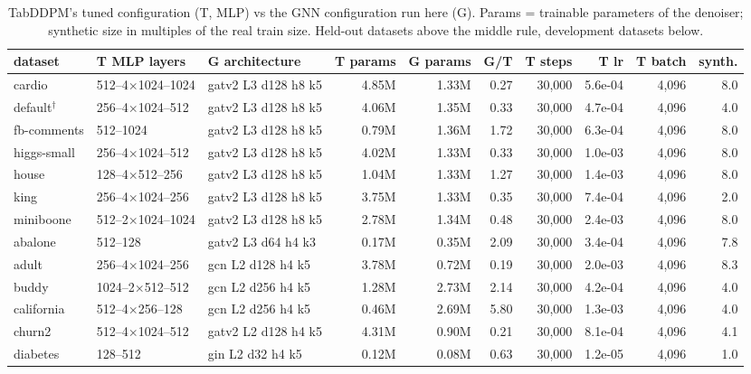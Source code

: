 \begin{table}[t]
\centering\footnotesize
\setlength{\tabcolsep}{3pt}
\caption{TabDDPM's tuned configuration (T, MLP) vs the GNN configuration run here (G). Params = trainable parameters of the denoiser; synthetic size in multiples of the real train size. Held-out datasets above the middle rule, development datasets below.}
\label{tab:config-comparison}
\begin{tabular}{lllrrrrrrr}
\toprule
dataset & T MLP layers & G architecture & T params & G params & G/T & T steps & T lr & T batch & synth. \\
\midrule
cardio & 512--4$\times$1024--1024 & gatv2 L3 d128 h8 k5 & 4.85M & 1.33M & 0.27 & 30{,}000 & 5.6e-04 & 4{,}096 & 8.0 \\
default$^\dagger$ & 256--4$\times$1024--512 & gatv2 L3 d128 h8 k5 & 4.06M & 1.35M & 0.33 & 30{,}000 & 4.7e-04 & 4{,}096 & 4.0 \\
fb-comments & 512--1024 & gatv2 L3 d128 h8 k5 & 0.79M & 1.36M & 1.72 & 30{,}000 & 6.3e-04 & 4{,}096 & 8.0 \\
higgs-small & 256--4$\times$1024--512 & gatv2 L3 d128 h8 k5 & 4.02M & 1.33M & 0.33 & 30{,}000 & 1.0e-03 & 4{,}096 & 8.0 \\
house & 128--4$\times$512--256 & gatv2 L3 d128 h8 k5 & 1.04M & 1.33M & 1.27 & 30{,}000 & 1.4e-03 & 4{,}096 & 8.0 \\
king & 256--4$\times$1024--256 & gatv2 L3 d128 h8 k5 & 3.75M & 1.33M & 0.35 & 30{,}000 & 7.4e-04 & 4{,}096 & 2.0 \\
miniboone & 512--2$\times$1024--1024 & gatv2 L3 d128 h8 k5 & 2.78M & 1.34M & 0.48 & 30{,}000 & 2.4e-03 & 4{,}096 & 8.0 \\
\midrule
abalone & 512--128 & gatv2 L3 d64 h4 k3 & 0.17M & 0.35M & 2.09 & 30{,}000 & 3.4e-04 & 4{,}096 & 7.8 \\
adult & 256--4$\times$1024--256 & gcn L2 d128 h4 k5 & 3.78M & 0.72M & 0.19 & 30{,}000 & 2.0e-03 & 4{,}096 & 8.3 \\
buddy & 1024--2$\times$512--512 & gcn L2 d256 h4 k5 & 1.28M & 2.73M & 2.14 & 30{,}000 & 4.2e-04 & 4{,}096 & 4.0 \\
california & 512--4$\times$256--128 & gcn L2 d256 h4 k5 & 0.46M & 2.69M & 5.80 & 30{,}000 & 1.3e-03 & 4{,}096 & 4.0 \\
churn2 & 512--4$\times$1024--512 & gatv2 L2 d128 h4 k5 & 4.31M & 0.90M & 0.21 & 30{,}000 & 8.1e-04 & 4{,}096 & 4.1 \\
diabetes & 128--512 & gin L2 d32 h4 k5 & 0.12M & 0.08M & 0.63 & 30{,}000 & 1.2e-05 & 4{,}096 & 1.0 \\

\end{tabular}
\end{table}

